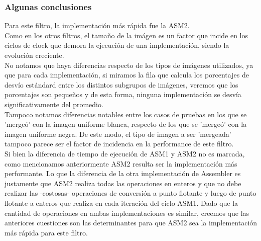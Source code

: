 \subsubsection{Algunas conclusiones}
Para este filtro, la implementación más rápida fue la ASM2.\\
Como en los otros filtros, el tamaño de la imágen es un factor que incide en los ciclos de clock que demora la ejecución de una implementación, siendo la evolución creciente.\\
No notamos que haya diferencias respecto de los tipos de imágenes utilizados, ya que para cada implementación, si miramos la fila que calcula los porcentajes de desvío estándard entre los distintos subgrupos de imágenes, veremos que los porcentajes son pequeños y de esta forma, ninguna implementación se desvía significativamente del promedio.\\
Tampoco notamos diferencias notables entre los casos de pruebas en los que se 'mergeó' con la imagen uniforme blanca, respecto de los que se 'mergeó' con la imagen uniforme negra. De este modo, el tipo de imagen a ser 'mergeada' tampoco parece ser el factor de incidencia en la performance de este filtro.\\
Si bien la diferencia de tiempo de ejecución de ASM1 y ASM2 no es marcada, como mencionamos anteriormente ASM2 resulta ser la implementación más performante. Lo que la diferencia de la otra implementación de Assembler es justamente que ASM2 realiza todas las operaciones en enteros y que no debe realizar las -costosas- operaciones de conversión a punto flotante y luego de punto flotante a enteros que realiza en cada iteración del ciclo ASM1. Dado que la cantidad de operaciones en ambas implementaciones es similar, creemos que las anteriores cuestiones son las determinantes para que ASM2 sea la implementación más rápida para este filtro.\\


